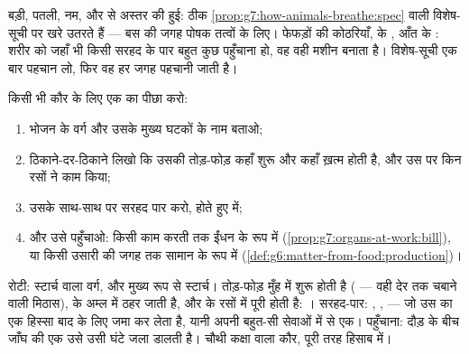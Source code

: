 \begin{example}[वही विशेष-सूची, फिर से]\label{ex:g7:digestion-and-nutrients:spec}
बड़ी, पतली, नम, और  से अस्तर की हुई:  ठीक
\cref{prop:g7:how-animals-breathe:spec} वाली विशेष-सूची पर खरे उतरते
हैं --- बस  की जगह पोषक तत्वों के लिए। फेफड़ों की कोठरियाँ,
 के , आँत के : शरीर को जहाँ भी किसी सरहद के पार बहुत
कुछ पहुँचाना हो, वह वही मशीन बनाता है। विशेष-सूची एक बार पहचान लो, फिर
वह हर जगह पहचानी जाती है।
\end{example}

\begin{method}[किसी पोषक तत्व का सिरे से सिरे तक पीछा करना]\label{met:g7:digestion-and-nutrients:trace}
किसी भी कौर के लिए एक  का पीछा करो:
\begin{enumerate}
  \item भोजन के वर्ग और उसके मुख्य घटकों के नाम बताओ;
  \item ठिकाने-दर-ठिकाने लिखो कि उसकी तोड़-फोड़ कहाँ शुरू और कहाँ
        ख़त्म होती है, और उस पर किन रसों ने काम किया;
  \item उसके साथ-साथ  पर सरहद पार करो,  होते हुए 
        में;
  \item और उसे पहुँचाओ: किसी काम करती  तक ईंधन के रूप में
        (\cref{prop:g7:organs-at-work:bill}), या किसी उसारी की जगह
        तक सामान के रूप में
        (\cref{def:g6:matter-from-food:production})।
\end{enumerate}
\end{method}

\begin{example}[रोटी पर चलाया हुआ पीछा]\label{ex:g7:digestion-and-nutrients:breadtrace}
रोटी: स्टार्च वाला वर्ग, और मुख्य रूप से स्टार्च। तोड़-फोड़ मुँह में
शुरू होती है ( --- वही देर तक चबाने वाली मिठास),  के अम्ल में
ठहर जाती है, और  के रसों में पूरी होती है: । सरहद-पार:
, ,  --- जो उस  का एक हिस्सा बाद के लिए जमा कर
लेता है, यानी अपनी बहुत-सी सेवाओं में से एक। पहुँचाना: दौड़ के बीच जाँघ
की एक  उसे उसी घंटे जला डालती है। चौथी कक्षा वाला कौर, पूरी तरह
हिसाब में।
\end{example}

